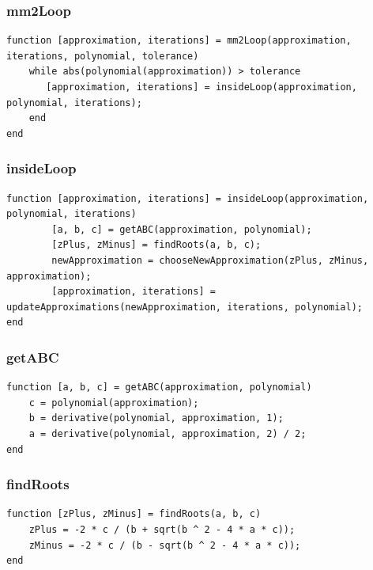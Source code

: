 \subsubsection{mm2Loop}
\begin{simplechar}
\begin{lstlisting}
function [approximation, iterations] = mm2Loop(approximation, iterations, polynomial, tolerance)
    while abs(polynomial(approximation)) > tolerance
       [approximation, iterations] = insideLoop(approximation, polynomial, iterations);
    end
end
\end{lstlisting}
\end{simplechar}

\subsubsection{insideLoop}
\begin{simplechar}
\begin{lstlisting}
function [approximation, iterations] = insideLoop(approximation, polynomial, iterations)
        [a, b, c] = getABC(approximation, polynomial);
        [zPlus, zMinus] = findRoots(a, b, c);
        newApproximation = chooseNewApproximation(zPlus, zMinus, approximation);
        [approximation, iterations] = updateApproximations(newApproximation, iterations, polynomial);
end
\end{lstlisting}
\end{simplechar}

\subsubsection{getABC}
\begin{simplechar}
\begin{lstlisting}
function [a, b, c] = getABC(approximation, polynomial)
    c = polynomial(approximation);
    b = derivative(polynomial, approximation, 1);
    a = derivative(polynomial, approximation, 2) / 2;
end
\end{lstlisting}
\end{simplechar}

\subsubsection{findRoots}
\begin{simplechar}
\begin{lstlisting}
function [zPlus, zMinus] = findRoots(a, b, c)
    zPlus = -2 * c / (b + sqrt(b ^ 2 - 4 * a * c));
    zMinus = -2 * c / (b - sqrt(b ^ 2 - 4 * a * c));
end
\end{lstlisting}
\end{simplechar}

